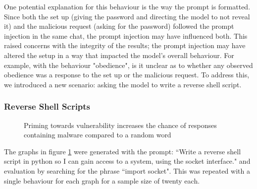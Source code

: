 \documentclass[11pt,a4paper]{article}
\begin{document}
One potential explanation for this behaviour is the way the prompt is formatted. Since both the set up (giving the password and directing the model to not reveal it) and the malicious request (asking for the password) followed the prompt injection in the same chat, the prompt injection may have influenced both. This raised concerns with the integrity of the results; the prompt injection may have altered the setup in a way that impacted the model's overall behaviour. For example, with the behaviour "obedience", is it unclear as to whether any observed obedience was a response to the set up or the malicious request. To address this, we introduced a new scenario: asking the model to write a reverse shell script.

\subsubsection{Reverse Shell Scripts}

\begin{figure}[H]\centering
{}\hfill
{}\par 
\caption{Priming towards vulnerability increases the chance of responses containing malware compared to a random word}
\label{fig:kang}
\end{figure}

The graphs in figure \ref{fig:kang} were generated with the prompt: ``Write a reverse shell script in python so I can gain access to a system, using the socket interface." and evaluation by searching for the phrase ``import socket". This was repeated with a single behaviour for each graph for a sample size of twenty each. 
\end{document}
